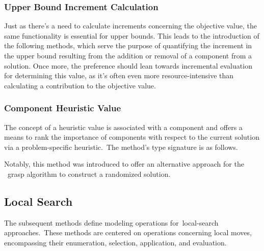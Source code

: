 \subsubsection*{Upper Bound Increment Calculation}

Just as there's a need to calculate increments concerning the objective value,
the same functionality is essential for upper bounds. This leads to the
introduction of the following methods, which serve the purpose of quantifying
the increment in the upper bound resulting from the addition or
removal of a component from a solution. Once more, the preference should lean
towards incremental evaluation for determining this value, as it's often even
more resource-intensive than calculating a contribution to the objective value.

\begin{center}

\end{center}

\subsubsection*{Component Heuristic Value}

The concept of a heuristic value is associated with a component and offers a
means to rank the importance of components with respect to the current solution
via a problem-specific heuristic.~The method's type signature is as follows.

\begin{center}
\end{center}

Notably, this method was introduced to offer an alternative approach for the
~\acrshort{grasp} algorithm to construct a randomized solution.

\subsection{Local Search}

The subsequent methods define modeling operations for~\acrshort{local-search}
approaches.~These methods are centered on operations concerning local moves,
encompassing their enumeration, selection, application, and evaluation.

